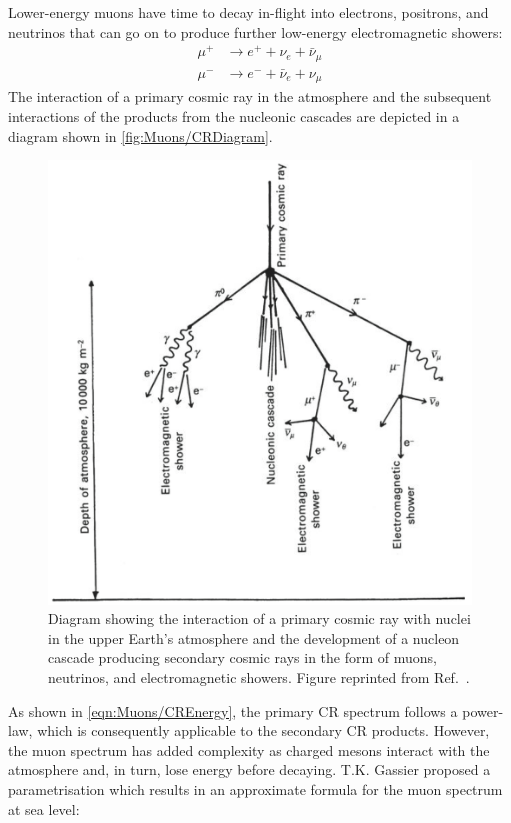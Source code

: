 Lower-energy muons have time to decay in-flight into electrons, positrons, and neutrinos that can go on to produce further low-energy electromagnetic showers:
\begin{equation}
\begin{split}    
    \mu^+&\rightarrow e^++\nu_e+\bar\nu_\mu \\
    \mu^-&\rightarrow e^-+\bar\nu_e+\nu_\mu
\end{split}
\end{equation}
The interaction of a primary cosmic ray in the atmosphere and the subsequent interactions of the products from the nucleonic cascades are depicted in a diagram shown in \autoref{fig:Muons/CRDiagram}.
\begin{figure}[h!]
    \centering
    \includegraphics[width=0.7\linewidth]{figures/Muons/MuonShower.png}
    \caption[Diagram showing the interaction of a primary cosmic ray with nuclei in the upper Earth's atmosphere and the development of a nucleon cascade.]{Diagram showing the interaction of a primary cosmic ray with nuclei in the upper Earth's atmosphere and the development of a nucleon cascade producing secondary cosmic rays in the form of muons, neutrinos, and electromagnetic showers. Figure reprinted from Ref.~\cite{Longair_2011}.}
    \label{fig:Muons/CRDiagram}
\end{figure}
As shown in \autoref{eqn:Muons/CREnergy}, the primary CR spectrum follows a power-law, which is consequently applicable to the secondary CR products. However, the muon spectrum has added complexity as charged mesons interact with the atmosphere and, in turn, lose energy before decaying. T.K. Gassier proposed a parametrisation \cite{Gaisser_Engel_Resconi_2016} which results in an approximate formula for the muon spectrum at sea level:
